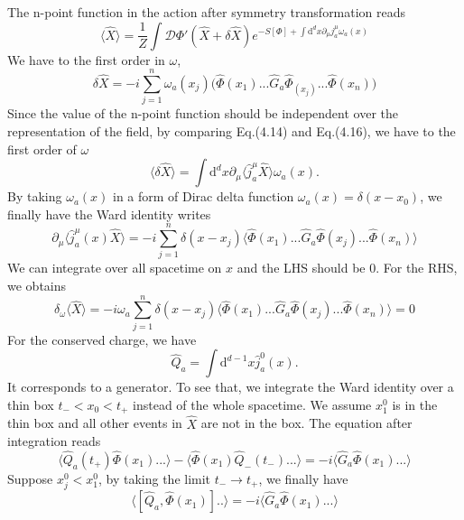 \documentclass[a4paper,11pt]{article}
\begin{document}
The n-point function in the action after symmetry transformation reads
\begin{equation}
    \langle\hat{X}\rangle=\frac{1}{Z}\int\mathcal{D}\Phi'(\hat{X}+\delta\hat{X})e^{-S[\Phi]+\int\mathrm{d}^dx\partial_\mu j^{\mu}_a\omega_a(x)}
\end{equation}
We have to the first order in $\omega$,
\begin{equation}
    \delta\hat{X}=-i\sum_{j=1}^n\omega_a(x_j)\bigg(\hat{\Phi}(x_1)...\hat{G}_a\hat{\Phi}_(x_j)...\hat{\Phi}(x_n)\bigg)
\end{equation}
Since the value of the n-point function should be independent over the representation of the field, by comparing Eq.(4.14) and Eq.(4.16), we have to the first order of $\omega$
\begin{equation}
    \langle\delta\hat{X}\rangle=\int\mathrm{d}^dx\partial_\mu\langle\hat{j}^{\mu}_a\hat{X}\rangle\omega_a(x).
\end{equation}
By taking $\omega_a(x)$ in a form of Dirac delta function $\omega_a(x)=\delta(x-x_0)$, we finally have the Ward identity writes
\begin{equation}
    \partial_\mu\langle\hat{j}_a^{\mu}(x)\hat{X}\rangle=-i\sum_{j=1}^n\delta(x-x_j)\langle\hat{\Phi}(x_1)...\hat{G}_a\hat{\Phi}(x_j)...\hat{\Phi}(x_n)\rangle
\end{equation}
We can integrate over all spacetime on $x$ and the LHS should be $0$. For the RHS, we obtains
\begin{equation}
    \delta_\omega\langle\hat{X}\rangle=-i\omega_a\sum_{j=1}^n\delta(x-x_j)\langle\hat{\Phi}(x_1)...\hat{G}_a\hat{\Phi}(x_j)...\hat{\Phi}(x_n)\rangle=0
\end{equation}
For the conserved charge, we have
\begin{equation}
    \hat{Q}_a=\int\mathrm{d}^{d-1}x\hat{j}_a^0(x).
\end{equation}
It corresponds to a generator. To see that, we integrate the Ward identity over a thin box $t_-<x_0<t_+$ instead of the whole spacetime. We assume $x_1^0$ is in the thin box and all other events in $\hat{X}$ are not in the box. The equation after integration reads
\begin{equation}
    \langle\hat{Q}_a(t_+)\hat\Phi(x_1)...\rangle-\langle\hat{\Phi}(x
    _1)\hat{Q}_-(t_-)...\rangle=-i\langle\hat{G}_a\hat{\Phi}(x_1)...\rangle
\end{equation}
Suppose $x_j^0<x_1^0$, by taking the limit $t_-\rightarrow t_+$, we finally have
\begin{equation}
    \langle[\hat{Q}_a,\hat{\Phi}(x_1)]..\rangle=-i\langle\hat{G}_a\hat{\Phi}(x_1)...\rangle
\end{equation}
\end{document}
